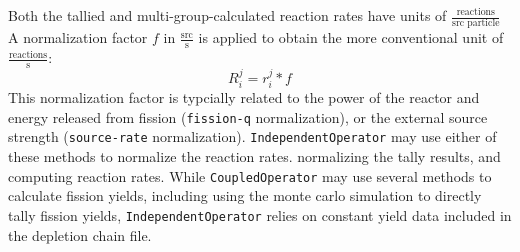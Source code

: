         Both the tallied and multi-group-calculated reaction rates have units of
        $\frac{\text{reactions}}{\text{src particle}}$ A normalization factor
        $f$ in $\frac{\text{src}}{\text{s}}$ is applied to obtain the more
        conventional unit of $\frac{\text{reactions}}{\text{s}}$:
        \begin{equation}
            R^j_i = r^j_i * f
        \end{equation}
        This normalization factor is typcially related to the power of the
        reactor and energy released from fission (\verb.fission-q.
        normalization), or the external source strength (\verb.source-rate.
        normalization). \verb.IndependentOperator. may use either of these methods to normalize
        the reaction rates. normalizing the tally results, and computing
        reaction rates. While \verb.CoupledOperator. may use several methods to
        calculate fission yields, including using the monte carlo simulation to
        directly tally fission yields, \verb.IndependentOperator. relies on
        constant yield data included in the depletion chain file.
